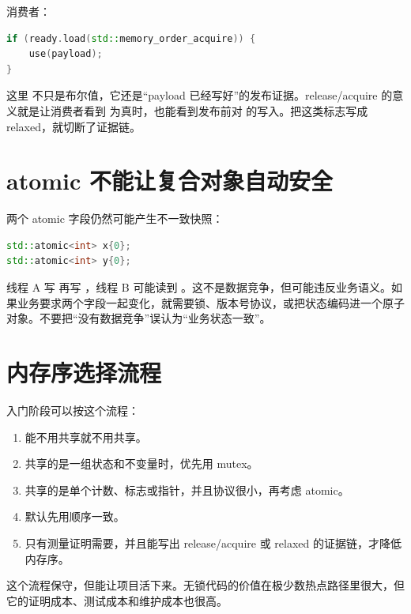 消费者：

\begin{lstlisting}[language=C++,caption={读取标志后使用数据}]
if (ready.load(std::memory_order_acquire)) {
    use(payload);
}
\end{lstlisting}

这里  不只是布尔值，它还是“payload 已经写好”的发布证据。release/acquire 的意义就是让消费者看到  为真时，也能看到发布前对  的写入。把这类标志写成 relaxed，就切断了证据链。

\section{atomic 不能让复合对象自动安全}

两个 atomic 字段仍然可能产生不一致快照：

\begin{lstlisting}[language=C++,caption={两个 atomic 字段不能自动组成事务}]
std::atomic<int> x{0};
std::atomic<int> y{0};
\end{lstlisting}

线程 A 写  再写 ，线程 B 可能读到 。这不是数据竞争，但可能违反业务语义。如果业务要求两个字段一起变化，就需要锁、版本号协议，或把状态编码进一个原子对象。不要把“没有数据竞争”误认为“业务状态一致”。

\section{内存序选择流程}

入门阶段可以按这个流程：

\begin{enumerate}
  \item 能不用共享就不用共享。
  \item 共享的是一组状态和不变量时，优先用 mutex。
  \item 共享的是单个计数、标志或指针，并且协议很小，再考虑 atomic。
  \item 默认先用顺序一致。
  \item 只有测量证明需要，并且能写出 release/acquire 或 relaxed 的证据链，才降低内存序。
\end{enumerate}

这个流程保守，但能让项目活下来。无锁代码的价值在极少数热点路径里很大，但它的证明成本、测试成本和维护成本也很高。
